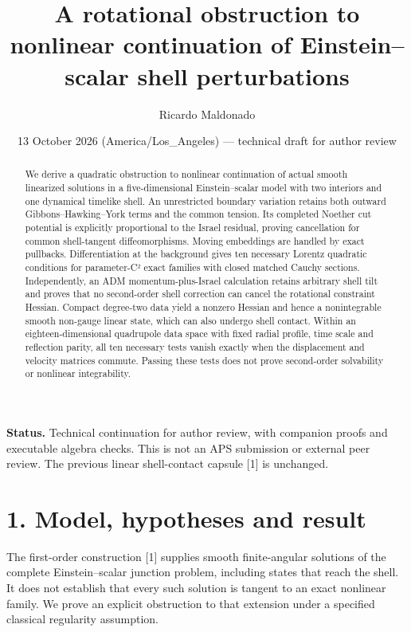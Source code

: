 \documentclass[
  10pt,
]{article}
\title{A rotational obstruction to nonlinear continuation of
Einstein--scalar shell perturbations}
\author{Ricardo Maldonado}
\date{13 October 2026 (America/Los\_Angeles) --- technical draft for
author review}
\begin{document}
\maketitle
\begin{abstract}
We derive a quadratic obstruction to nonlinear continuation of actual
smooth linearized solutions in a five-dimensional Einstein--scalar model
with two interiors and one dynamical timelike shell. An unrestricted
boundary variation retains both outward Gibbons--Hawking--York terms and
the common tension. Its completed Noether cut potential is explicitly
proportional to the Israel residual, proving cancellation for common
shell-tangent diffeomorphisms. Moving embeddings are handled by exact
pullbacks. Differentiation at the background gives ten necessary Lorentz
quadratic conditions for parameter-C² exact families with closed matched
Cauchy sections. Independently, an ADM momentum-plus-Israel calculation
retains arbitrary shell tilt and proves that no second-order shell
correction can cancel the rotational constraint Hessian. Compact
degree-two data yield a nonzero Hessian and hence a nonintegrable smooth
non-gauge linear state, which can also undergo shell contact. Within an
eighteen-dimensional quadrupole data space with fixed radial profile,
time scale and reflection parity, all ten necessary tests vanish exactly
when the displacement and velocity matrices commute. Passing these tests
does not prove second-order solvability or nonlinear integrability.
\end{abstract}

\textbf{Status.} Technical continuation for author review, with
companion proofs and executable algebra checks. This is not an APS
submission or external peer review. The previous linear shell-contact
capsule {[}1{]} is unchanged.

\section{1. Model, hypotheses and
result}\label{model-hypotheses-and-result}

The first-order construction {[}1{]} supplies smooth finite-angular
solutions of the complete Einstein--scalar junction problem, including
states that reach the shell. It does not establish that every such
solution is tangent to an exact nonlinear family. We prove an explicit
obstruction to that extension under a specified classical regularity
assumption.
\end{document}
